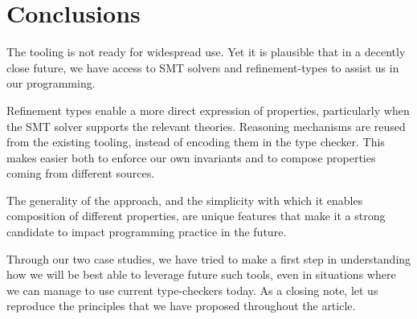 \documentclass[sigconf, review]{acmart}
\begin{document}
\section{Conclusions}
\label{conclusions}

The tooling is not ready for widespread use. Yet it is plausible that in a decently
close future, we have access to SMT solvers and refinement-types to assist us in
our programming.

Refinement types enable a more direct expression of properties,
particularly when the SMT solver supports the relevant theories. Reasoning
mechanisms are reused from the existing tooling, instead of encoding them
in the type checker. This makes easier both to enforce our own invariants and to
compose properties coming from different sources.

The generality of the approach, and the simplicity with which it enables
composition of different properties, are unique features that make it a strong
candidate to impact programming practice in the future.

Through our two case studies, we have tried to make a first step in
understanding how we will be best able to leverage future such tools, even
in situations where we can manage to use current type-checkers today. As a closing
note, let us reproduce the principles that we have proposed throughout the article.

\vspace{-0.8cm}
\listofkeytheorems[
  ignoreall,
  show={principle},
  print-body,
  title={},
  ]



\end{document}
